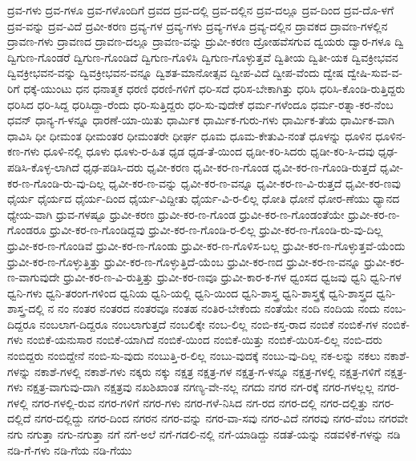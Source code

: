 {ದ್ರವ-ಗಳು
ದ್ರವ-ಗಳೂ
ದ್ರವ-ಗಳೊಂದಿಗೆ
ದ್ರವದ
ದ್ರವ-ದಲ್ಲಿ
ದ್ರವ-ದಲ್ಲಿನ
ದ್ರವ-ದಲ್ಲೂ
ದ್ರವ-ದಿಂದ
ದ್ರವ-ದೊ-ಳಗೆ
ದ್ರವ-ವನ್ನು
ದ್ರವ-ವಿದೆ
ದ್ರವೀ-ಕರಣ
ದ್ರವ್ಯ-ಗಳ
ದ್ರವ್ಯ-ಗಳು
ದ್ರವ್ಯ-ಗಳೂ
ದ್ರವ್ಯ-ದಲ್ಲಿನ
ದ್ರಾವಕದ
ದ್ರಾವಣ-ಗಳಲ್ಲಿನ
ದ್ರಾವಣ-ಗಳು
ದ್ರಾವಣದ
ದ್ರಾವಣ-ದಲ್ಲೂ
ದ್ರಾವಣ-ವನ್ನು
ದ್ರುವೀ-ಕರಣ
ದ್ರೋಹವೆಸಗುವ
ದ್ವಯರು
ದ್ವಾರ-ಗಳೂ
ದ್ವಿ
ದ್ವಿಗುಣ-ಗೊಂಡರೆ
ದ್ವಿಗುಣ-ಗೊಂಡಿದೆ
ದ್ವಿಗುಣ-ಗೊಳಿಸಿ
ದ್ವಿಗುಣ-ಗೊಳ್ಳುತ್ತವೆ
ದ್ವಿತೀಯ
ದ್ವಿತೀ-ಯಕ
ದ್ವಿವಕ್ರೀಭವನ
ದ್ವಿವಕ್ರೀಭವನ-ವನ್ನು
ದ್ವಿವಕ್ರೀಭವನ-ವನ್ನೂ
ದ್ವಿಶತ-ಮಾನೋತ್ಸವ
ದ್ವೀಪ-ವಿದೆ
ದ್ವೀಪ-ವೆಂದು
ದ್ವೇಷ
ದ್ವೇಷಿ-ಸುವ-ವ-ರಿಗೆ
ಧಕ್ಕೆ-ಯುಂಟು
ಧನ
ಧನಾತ್ಮಕ
ಧರಣಿ
ಧರಣಿ-ಗಳಿಗೆ
ಧರಿ-ಸದೆ
ಧರಿಸ-ಬೇಕಾಗಿತ್ತು
ಧರಿಸಿ
ಧರಿಸಿ-ಕೊಂಡಿ-ರುತ್ತಿದ್ದರು
ಧರಿಸಿದ
ಧರಿ-ಸಿದ್ದ
ಧರಿಸಿದ್ದಾ-ರೆಂದು
ಧರಿ-ಸುತ್ತಿದ್ದರು
ಧರಿ-ಸು-ವುದೇಕೆ
ಧರ್ಮ-ಗಳೆಂದೂ
ಧರ್ಮ-ರತ್ನಾ-ಕರ-ನೆಂಬ
ಧವನ್
ಧಾನ್ಯ-ಗ-ಳನ್ನೂ
ಧಾರಣೆ-ಯಾ-ಯಿತು
ಧಾರ್ಮಿಕ
ಧಾರ್ಮಿಕ-ಗುರು-ಗಳು
ಧಾರ್ಮಿಕ-ತೆಯ
ಧಾರ್ಮಿಕ-ವಾಗಿ
ಧಾವಿಸಿ
ಧೀ
ಧೀಮಂತ
ಧೀಮಂತರ
ಧೀಮಂತರೇ
ಧೀರ್ಘ
ಧೂಮ
ಧೂಮ-ಕೇತುವಿ-ನಂತೆ
ಧೂಳನ್ನು
ಧೂಳಿನ
ಧೂಳಿನ-ಕಣ-ಗಳು
ಧೂಳಿ-ನಲ್ಲಿ
ಧೂಳು
ಧೂಳು-ರ-ಹಿತ
ಧೃಡ
ಧೃಡ-ತೆ-ಯಿಂದ
ಧೃಡೀ-ಕರಿ-ಸಿದರು
ಧೃಡೀ-ಕರಿ-ಸಿ-ದವು
ಧೃಢ-ಪಡಿಸಿ-ಕೊಳ್ಳ-ಲಾಗಿದೆ
ಧೃಢ-ಪಡಿಸಿ-ದರು
ಧೃವೀ-ಕರಣ
ಧೃವೀ-ಕರ-ಣ-ಗೊಂಡ
ಧೃವೀ-ಕರ-ಣ-ಗೊಂಡಿ-ರುತ್ತದೆ
ಧೃವೀ-ಕರ-ಣ-ಗೊಂಡಿ-ರು-ವು-ದಿಲ್ಲ
ಧೃವೀ-ಕರ-ಣ-ವನ್ನು
ಧೃವೀ-ಕರ-ಣ-ವನ್ನೂ
ಧೃವೀ-ಕರ-ಣ-ವಿ-ರುತ್ತದೆ
ಧೃವೀ-ಕರ-ಣವು
ಧೈರ್ಯ
ಧೈರ್ಯದ
ಧೈರ್ಯ-ದಿಂದ
ಧೈರ್ಯ-ವಿದ್ದೀತು
ಧೈರ್ಯ-ವಿ-ರ-ಲಿಲ್ಲ
ಧೋತಿ
ಧೋನೆ
ಧೋರ-ಣೆಯು
ಧ್ಯಾನದ
ಧ್ಯೇಯ-ವಾಗಿ
ಧ್ರುವ-ಗಳಷ್ಟೂ
ಧ್ರುವೀ-ಕರಣ
ಧ್ರುವೀ-ಕರ-ಣ-ಗೊಂಡ
ಧ್ರುವೀ-ಕರ-ಣ-ಗೊಂಡಂತೆಯೇ
ಧ್ರುವೀ-ಕರ-ಣ-ಗೊಂಡರೂ
ಧ್ರುವೀ-ಕರ-ಣ-ಗೊಂಡಿದ್ದವು
ಧ್ರುವೀ-ಕರ-ಣ-ಗೊಂಡಿ-ರ-ಲಿಲ್ಲ
ಧ್ರುವೀ-ಕರ-ಣ-ಗೊಂಡಿ-ರು-ವು-ದಿಲ್ಲ
ಧ್ರುವೀ-ಕರ-ಣ-ಗೊಂಡಿವೆ
ಧ್ರುವೀ-ಕರ-ಣ-ಗೊಂಡು
ಧ್ರುವೀ-ಕರ-ಣ-ಗೊಳಿಸ-ಬಲ್ಲ
ಧ್ರುವೀ-ಕರ-ಣ-ಗೊಳ್ಳುತ್ತವೆ-ಯೆಂದು
ಧ್ರುವೀ-ಕರ-ಣ-ಗೊಳ್ಳುತ್ತಿತ್ತು
ಧ್ರುವೀ-ಕರ-ಣ-ಗೊಳ್ಳುತ್ತಿದೆ-ಯೆಂಬ
ಧ್ರುವೀ-ಕರ-ಣದ
ಧ್ರುವೀ-ಕರ-ಣ-ವನ್ನೂ
ಧ್ರುವೀ-ಕರ-ಣ-ವಾಗುವುದೇ
ಧ್ರುವೀ-ಕರ-ಣ-ವಿ-ರುತ್ತಿತ್ತು
ಧ್ರುವೀ-ಕರ-ಣವೂ
ಧ್ರುವೀ-ಕಾರ-ಕ-ಗಳ
ಧ್ವಂಸದ
ಧ್ವಜವು
ಧ್ವನಿ
ಧ್ವನಿ-ಗಳ
ಧ್ವನಿ-ಗಳು
ಧ್ವನಿ-ತರಂಗ-ಗಳಿಂದ
ಧ್ವನಿಯ
ಧ್ವನಿ-ಯಲ್ಲಿ
ಧ್ವನಿ-ಯಿಂದ
ಧ್ವನಿ-ಶಾಸ್ತ್ರ
ಧ್ವನಿ-ಶಾಸ್ತ್ರಕ್ಕೆ
ಧ್ವನಿ-ಶಾಸ್ತ್ರದ
ಧ್ವನಿ-ಶಾಸ್ತ್ರ-ದಲ್ಲಿ
ನ
ನಂ
ನಂತರ
ನಂತರದ
ನಂತರವೂ
ನಂತಹ
ನಂತಿರ-ಬೇಕೆಂದು
ನಂತೆಯೇ
ನಂದಿ
ನಂದಿಯ
ನಂದು
ನಂಬ-ದಿದ್ದರೂ
ನಂಬಲಾಗ-ದಿದ್ದರೂ
ನಂಬಲಾಗುತ್ತದೆ
ನಂಬಲಿಕ್ಕೇ
ನಂಬ-ಲಿಲ್ಲ
ನಂಬಿ-ಕಸ್ತ-ರಾದ
ನಂಬಿಕೆ
ನಂಬಿಕೆ-ಗಳ
ನಂಬಿಕೆ-ಗಳು
ನಂಬಿಕೆ-ಯನುಸಾರ
ನಂಬಿಕೆ-ಯಾಗಿದೆ
ನಂಬಿಕೆ-ಯಿಂದ
ನಂಬಿಕೆ-ಯಿತ್ತು
ನಂಬಿಕೆ-ಯಿರಿಸ-ಲಿಲ್ಲ
ನಂಬಿ-ದರು
ನಂಬಿದ್ದರು
ನಂಬಿದ್ದೇನೆ
ನಂಬಿ-ಸು-ವುದು
ನಂಬುತ್ತಿ-ರ-ಲಿಲ್ಲ
ನಂಬು-ವುದಕ್ಕೆ
ನಂಬು-ವು-ದಿಲ್ಲ
ನಕ-ಲನ್ನು
ನಕಲು
ನಕಾಶೆ-ಗಳನ್ನು
ನಕಾಶೆ-ಗಳಲ್ಲಿ
ನಕಾಶೆ-ಗಳು
ನಕ್ಕರು
ನಕ್ಕು
ನಕ್ಷತ್ರ
ನಕ್ಷತ್ರ-ಗಳ
ನಕ್ಷತ್ರ-ಗ-ಳನ್ನೂ
ನಕ್ಷತ್ರ-ಗಳಲ್ಲಿ
ನಕ್ಷತ್ರ-ಗಳಿಗೆ
ನಕ್ಷತ್ರ-ಗಳು
ನಕ್ಷತ್ರ-ವಾಗುವು-ದಾಗಿ
ನಕ್ಷತ್ರವು
ನಖಶಿಖಾಂತ
ನಗಣ್ಯ-ವೇ-ನಲ್ಲ
ನಗದು
ನಗರ
ನಗ-ರಕ್ಕೆ
ನಗರ-ಗಳಲ್ಲಲ್ಲ
ನಗರ-ಗಳಲ್ಲಿ
ನಗರ-ಗಳಲ್ಲಿ-ರುವ
ನಗರ-ಗಳಿಗೆ
ನಗರ-ಗಳು
ನಗರ-ಗಳೆ-ನಿಸಿದ
ನಗ-ರದ
ನಗರ-ದಲ್ಲಿ
ನಗರ-ದಲ್ಲಿತ್ತು
ನಗರ-ದಲ್ಲಿದೆ
ನಗರ-ದಲ್ಲಿದ್ದು
ನಗರ-ದಿಂದ
ನಗರನ
ನಗರ-ವನ್ನು
ನಗರ-ವಾ-ಸವು
ನಗರ-ವಿದೆ
ನಗರವು
ನಗರ-ವೆಂಬ
ನಗರವೇ
ನಗು
ನಗುತ್ತಾ
ನಗು-ನಗುತ್ತಾ
ನಗೆ
ನಗೆ-ಅಲೆ
ನಗೆ-ಗಡಲಿ-ನಲ್ಲಿ
ನಗೆ-ಯಾಡಿದ್ದು
ನಡತೆ-ಯನ್ನು
ನಡವಳಿಕೆ-ಗಳನ್ನು
ನಡಿ
ನಡಿ-ಗೆ-ಗಳು
ನಡಿ-ಗೆಯ
ನಡಿ-ಗೆಯು
}
